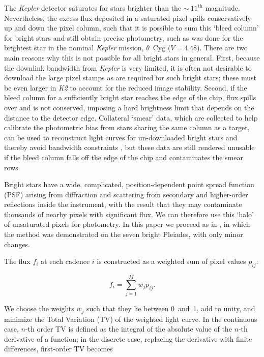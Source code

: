 \documentclass[modern]{aastex61}
\newcommand{\kepler}{\emph{Kepler}\xspace}
\newcommand{\ktwo}{\emph{K2}\xspace}
\begin{document}
The \kepler detector saturates for stars brighter than the $\sim~11^\text{th}$ magnitude. Nevertheless, the excess flux deposited in a saturated pixel spills conservatively up and down the pixel column, such that it is possible to sum this `bleed column' for bright stars and still obtain precise photometry, such as was done for the brightest star in the nominal \kepler mission, $\theta$~Cyg \citep{guzik2011,thetacygwhite,guzik2016} ($V = 4.48$). There are two main reasons why this is not possible for all bright stars in general. First, because the downlink bandwidth from \kepler is very limited, it is often not desirable to download the large pixel stamps as are required for such bright stars; these must be even larger in \ktwo to account for the reduced image stability. Second, if the bleed column for a sufficiently bright star reaches the edge of the chip, flux spills over and is not conserved, imposing a hard brightness limit that depends on the distance to the detector edge. 
Collateral `smear' data, which are collected to help calibrate the photometric bias from stars sharing the same column as a target, can be used to reconstruct light curves for un-downloaded bright stars and thereby avoid bandwidth constraints \citep{k2smear}, but these data are still rendered unusable if the bleed column falls off the edge of the chip and contaminates the smear rows.

Bright stars have a wide, complicated, position-dependent point spread function (PSF) arising from diffraction and scattering from secondary and higher-order reflections inside the instrument, with the result that they may contaminate thousands of nearby pixels with significant flux. We can therefore use this `halo' of unsaturated pixels for photometry. In this paper we proceed as in \citet{White2017}, in which the method was demonstrated on the seven bright Pleiades, with only minor changes.

The flux $f_i$ at each cadence $i$ is constructed as a weighted sum of pixel values $p_{ij}$:

\begin{equation}
	f_i = \sum_{j=1}^{M} w_j p_{ij}.
\end{equation}

\noindent We choose the weights $w_j$ such that they lie between 0~and~1, add to unity, and minimize the Total Variation (TV) of the weighted light curve. In the continuous case, $n$-th order TV is defined as the integral of the absolute value of the $n$-th derivative of a function; in the discrete case, replacing the derivative with finite differences, first-order TV becomes
\end{document}
